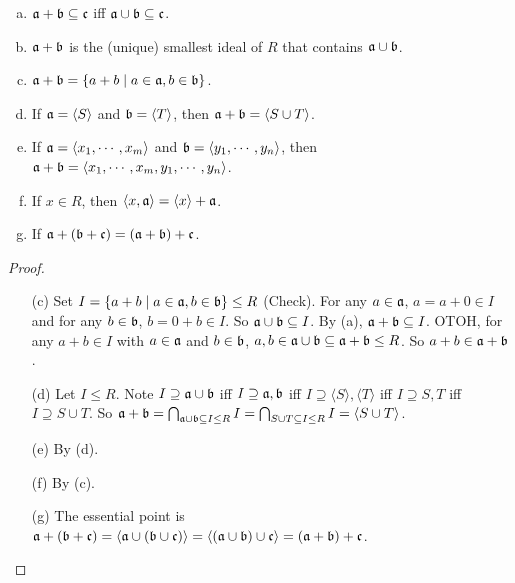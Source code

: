 \begin{fact}
    \begin{enumerate}[(a)]
        \item $\mathfrak{a} + \mathfrak{b} \subseteq \mathfrak{c}$ iff $\mathfrak{a} \cup \mathfrak{b} \subseteq \mathfrak{c}$.
        \item $\mathfrak{a} + \mathfrak{b}$ is the (unique) smallest ideal of $R$ that contains $\mathfrak{a} \cup \mathfrak{b}$.
        \item $\mathfrak{a} + \mathfrak{b} = \{a + b \mid a \in \mathfrak{a}, b \in \mathfrak{b}\}$.
        \item If $\mathfrak{a} = \langle S \rangle$ and $\mathfrak{b} = \langle T \rangle$, then $\mathfrak{a} + \mathfrak{b} = \langle S \cup T \rangle$.
        \item If $\mathfrak{a} = \langle x_1,\cdots,x_m \rangle$ and $\mathfrak{b} = \langle y_1,\cdots,y_n \rangle$, then $\mathfrak{a} + \mathfrak{b} = \langle x_1,\cdots,x_m, y_1,\cdots,y_n \rangle$.
        \item If $x \in R$, then $\langle x,\mathfrak{a} \rangle = \langle x \rangle + \mathfrak{a}$.
        \item If $\mathfrak{a} + (\mathfrak{b} + \mathfrak{c}) = (\mathfrak{a} + \mathfrak{b}) + \mathfrak{c}$.
    \end{enumerate}
\end{fact}

\begin{proof}
    \begin{enumerate}
        \item [(c)]
            Set $I = \{a+b \mid a \in \mathfrak{a},b \in \mathfrak{b}\} \leq R$ (Check). For any $a \in \mathfrak{a}$, $a = a + 0 \in I$ and for any $b \in \mathfrak{b}$, $b = 0 + b \in I$. So $\mathfrak{a} \cup \mathfrak{b} \subseteq I$. By (a), $\mathfrak{a} + \mathfrak{b} \subseteq I$. OTOH, for any $a+b \in I$ with $a \in \mathfrak{a}$ and $b \in \mathfrak{b}$, $a,b \in \mathfrak{a} \cup \mathfrak{b} \subseteq \mathfrak{a} + \mathfrak{b} \leq R$. So $a + b \in \mathfrak{a} + \mathfrak{b}$.
        \item[(d)] Let $I \leq R$. Note $I \supseteq \mathfrak{a} \cup \mathfrak{b}$ iff $I \supseteq \mathfrak{a},\mathfrak{b}$ iff $I \supseteq \langle S \rangle, \langle T \rangle$ iff $I \supseteq S,T$ iff $I \supseteq S \cup T$. So $\mathfrak{a} + \mathfrak{b} = \bigcap_{\mathfrak{a} \cup \mathfrak{b} \subseteq I \leq R} I = \bigcap_{S \cup T \subseteq I \leq R} I = \langle S \cup T \rangle$.
        \item[(e)] By (d).
        \item[(f)] By (c).
        \item[(g)] The essential point is $\mathfrak{a} + (\mathfrak{b} + \mathfrak{c}) = \langle \mathfrak{a} \cup (\mathfrak{b} \cup \mathfrak{c}) \rangle = \langle (\mathfrak{a} \cup \mathfrak{b}) \cup \mathfrak{c} \rangle = (\mathfrak{a} + \mathfrak{b}) + \mathfrak{c}$.
    \end{enumerate}
\end{proof}

